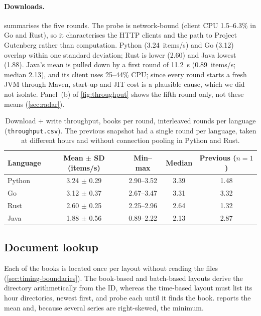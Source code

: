 \paragraph{Downloads.}
 summarises the five rounds. The probe is network-bound
(client CPU 1.5--6.3\% in Go and Rust), so it characterises the HTTP clients
and the path to Project Gutenberg rather than computation. Python
(3.24~items/s) and Go (3.12) overlap within one standard deviation; Rust is
lower (2.60) and Java lowest (1.88). Java's mean is pulled down by a first
round of 11.2~s (0.89~items/s; median 2.13), and its client uses 25--44\% CPU;
since every round starts a fresh JVM through Maven, start-up and JIT cost is
a plausible cause, which we did not isolate. Panel~(b) of
\cref{fig:throughput} shows the fifth round only, not these means
(\cref{sec:radar}).

\begin{table}[htbp]
    \centering
    \caption{Download + write throughput,  books per round,
     interleaved rounds per language (\texttt{throughput.csv}).
    The previous snapshot had a single round per language, taken at
    different hours and without connection pooling in Python and Rust.}
    \label{tab:download}
    \begin{tabular}{@{}lcccc@{}}
        \toprule
        Language & Mean $\pm$ SD (items/s) & Min--max & Median & Previous ($n=1$) \\
        \midrule
        Python & 3.24 $\pm$ 0.29 & 2.90--3.52 & 3.39 & 1.48 \\
        Go & 3.12 $\pm$ 0.37 & 2.67--3.47 & 3.31 & 3.32 \\
        Rust & 2.60 $\pm$ 0.25 & 2.25--2.96 & 2.64 & 1.32 \\
        Java & 1.88 $\pm$ 0.56 & 0.89--2.22 & 2.13 & 2.87 \\
        \bottomrule
    \end{tabular}
\end{table}

\subsection{Document lookup}
\label{sec:datalake-lookup}

Each of the  books is located once per layout without reading
the files (\cref{sec:timing-boundaries}). The book-based and batch-based
layouts derive the directory arithmetically from the ID, whereas the
time-based layout must list its hour directories, newest first, and probe
each until it finds the book.
 reports the mean and, because several series are
right-skewed, the minimum.

